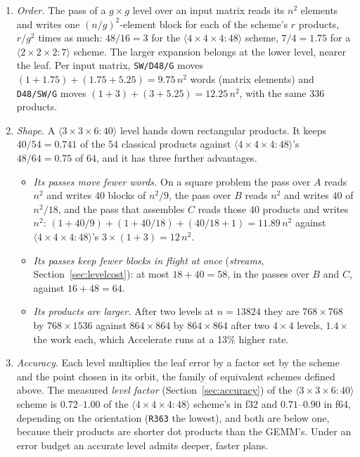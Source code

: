 \documentclass[11pt]{article}
\newcommand{\mm}[1]{\langle #1\rangle}
\newcommand{\lv}[1]{\texttt{#1}}
\begin{document}
\begin{enumerate}
\item \emph{Order.}  The pass of a $g\times g$ level over an input matrix
  reads its $n^2$ elements and writes one $(n/g)^2$-element block for each of
  the scheme's $r$ products, $r/g^2$ times as much: $48/16=3$ for the
  $\mm{4\times4\times4:48}$ scheme, $7/4=1.75$ for a $\mm{2\times2\times2:7}$
  scheme.  The larger expansion belongs at the
  lower level, nearer the leaf.  Per input matrix, \lv{SW/D48/G} moves
  $(1+1.75)+(1.75+5.25)=9.75\,n^2$ words (matrix elements) and
  \lv{D48/SW/G} moves $(1+3)+(3+5.25)=12.25\,n^2$, with the same $336$
  products.
\item \emph{Shape.}  A $\mm{3\times3\times6:40}$ level hands down rectangular
  products.  It keeps $40/54=0.741$ of the $54$ classical products against
  $\mm{4\times4\times4:48}$'s $48/64=0.75$ of $64$, and it has three further
  advantages.
  \begin{itemize}
  \item \emph{Its passes move fewer words.}  On a square problem the pass
    over $A$ reads $n^2$ and writes $40$ blocks of $n^2/9$, the pass over
    $B$ reads $n^2$ and writes $40$ of $n^2/18$, and the pass that assembles
    $C$ reads those $40$ products and writes $n^2$:
    $(1+40/9)+(1+40/18)+(40/18+1)=11.89\,n^2$ against
    $\mm{4\times4\times4:48}$'s $3\times(1+3)=12\,n^2$.
  \item \emph{Its passes keep fewer blocks in flight at once}
    (\emph{streams}, Section~\ref{sec:levelcost}): at most $18+40=58$, in the
    passes over $B$ and $C$, against $16+48=64$.
  \item \emph{Its products are larger.}  After two levels at $n=13824$ they
    are $768\times768$ by $768\times1536$ against $864\times864$ by
    $864\times864$ after two $4\times4$ levels, $1.4\times$ the work each,
    which Accelerate runs at a 13\% higher rate.
  \end{itemize}
\item \emph{Accuracy.}  Each level multiplies the leaf error by a factor set by
  the scheme and the point chosen in its orbit, the family of equivalent schemes defined above.  The measured \emph{level
  factor} (Section~\ref{sec:accuracy}) of the $\mm{3\times3\times6:40}$
  scheme is $0.72$--$1.00$ of the $\mm{4\times4\times4:48}$ scheme's in f32
  and $0.71$--$0.90$ in f64, depending on
  the orientation (\lv{R363} the lowest), and
  both are below one, because their products are shorter dot
  products than the GEMM's.  Under an error budget an accurate level admits
  deeper, faster plans.
\end{enumerate}
\end{document}
